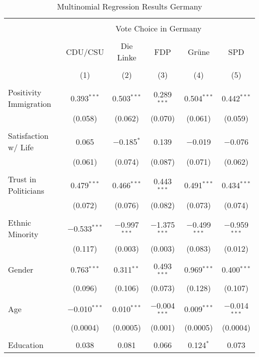 \documentclass[
  letterpaper,
  DIV=11,
  numbers=noendperiod]{scrreprt}
\begin{document}
\begin{table}[H] \centering 
  \caption{Multinomial Regression Results Germany} 
  \label{} 
\small 
\begin{tabular}{@{\extracolsep{-10pt}}lccccc} 
\\[-1.8ex]\hline 
\hline \\[-1.8ex] 
 & \multicolumn{5}{c}{Vote Choice in Germany} \\ 
\cline{2-6} 
\\[-1.8ex] & CDU/CSU & Die Linke & FDP & Grüne & SPD \\ 
\\[-1.8ex] & (1) & (2) & (3) & (4) & (5)\\ 
\hline \\[-1.8ex] 
 Positivity Immigration & 0.393$^{***}$ & 0.503$^{***}$ & 0.289$^{***}$ & 0.504$^{***}$ & 0.442$^{***}$ \\ 
  & (0.058) & (0.062) & (0.070) & (0.061) & (0.059) \\ 
  & & & & & \\ 
 Satisfaction w/ Life & 0.065 & $-$0.185$^{*}$ & 0.139 & $-$0.019 & $-$0.076 \\ 
  & (0.061) & (0.074) & (0.087) & (0.071) & (0.062) \\ 
  & & & & & \\ 
 Trust in Politicians & 0.479$^{***}$ & 0.466$^{***}$ & 0.443$^{***}$ & 0.491$^{***}$ & 0.434$^{***}$ \\ 
  & (0.072) & (0.076) & (0.082) & (0.073) & (0.074) \\ 
  & & & & & \\ 
 Ethnic Minority & $-$0.533$^{***}$ & $-$0.997$^{***}$ & $-$1.375$^{***}$ & $-$0.499$^{***}$ & $-$0.959$^{***}$ \\ 
  & (0.117) & (0.003) & (0.003) & (0.083) & (0.012) \\ 
  & & & & & \\ 
 Gender & 0.763$^{***}$ & 0.311$^{**}$ & 0.493$^{***}$ & 0.969$^{***}$ & 0.400$^{***}$ \\ 
  & (0.096) & (0.106) & (0.073) & (0.128) & (0.107) \\ 
  & & & & & \\ 
 Age & $-$0.010$^{***}$ & 0.010$^{***}$ & $-$0.004$^{***}$ & 0.009$^{***}$ & $-$0.014$^{***}$ \\ 
  & (0.0004) & (0.0005) & (0.001) & (0.0005) & (0.0004) \\ 
  & & & & & \\ 
 Education & 0.038 & 0.081 & 0.066 & 0.124$^{*}$ & 0.073 \\ 

\end{tabular}
\end{table}
\end{document}
